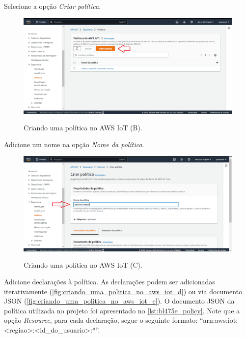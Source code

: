 Selecione a opção \textit{Criar política}.

\begin{figure}[H]
    \centering
    \caption{Criando uma política no AWS IoT (B).}
    \includegraphics[scale=0.472]{Imagens/criando_uma_politica_no_aws_iot_1.png}
    \label{fig:criando_uma_politica_no_aws_iot_b}
\end{figure}

Adicione um nome na opção \textit{Nome da política}.

\begin{figure}[H]
    \centering
    \caption{Criando uma política no AWS IoT (C).}
    \includegraphics[scale=0.472]{Imagens/criando_uma_politica_no_aws_iot_2.png}
    \label{fig:criando_uma_politica_no_aws_iot_c}
\end{figure}

Adicione declarações à política. As declarações podem ser adicionadas iterativamente (\autoref{fig:criando_uma_politica_no_aws_iot_d}) ou via documento JSON (\autoref{fig:criando_uma_politica_no_aws_iot_e}). O documento JSON da política utilizada no projeto foi apresentado no \autoref{lst:bl475e_policy}. Note que a opção \textit{Resource}, para cada declaração, segue o seguinte formato: ``arn:aws:iot: \textless regiao\textgreater:\textless id\_do\_usuario\textgreater:*''.

